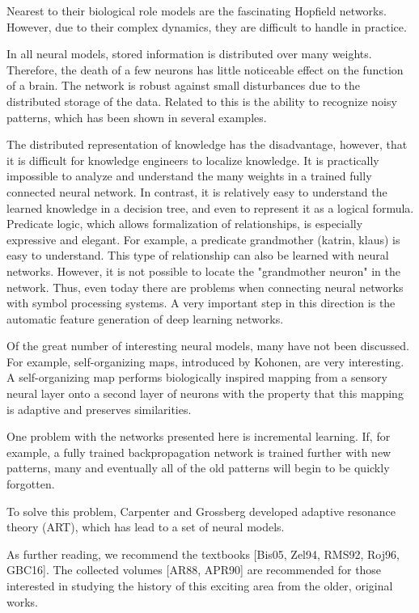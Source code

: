 \documentclass[10pt]{article}
\begin{document}
Nearest to their biological role models are the fascinating Hopfield networks. However, due to their complex dynamics, they are difficult to handle in practice.

In all neural models, stored information is distributed over many weights. Therefore, the death of a few neurons has little noticeable effect on the function of a brain. The network is robust against small disturbances due to the distributed storage of the data. Related to this is the ability to recognize noisy patterns, which has been shown in several examples.

The distributed representation of knowledge has the disadvantage, however, that it is difficult for knowledge engineers to localize knowledge. It is practically impossible to analyze and understand the many weights in a trained fully connected neural network. In contrast, it is relatively easy to understand the learned knowledge in a decision tree, and even to represent it as a logical formula. Predicate logic, which allows formalization of relationships, is especially expressive and elegant. For example, a predicate grandmother (katrin, klaus) is easy to understand. This type of relationship can also be learned with neural networks. However, it is not possible to locate the "grandmother neuron" in the network. Thus, even today there are problems when connecting neural networks with symbol processing systems. A very important step in this direction is the automatic feature generation of deep learning networks.

Of the great number of interesting neural models, many have not been discussed. For example, self-organizing maps, introduced by Kohonen, are very interesting. A self-organizing map performs biologically inspired mapping from a sensory neural layer onto a second layer of neurons with the property that this mapping is adaptive and preserves similarities.

One problem with the networks presented here is incremental learning. If, for example, a fully trained backpropagation network is trained further with new patterns, many and eventually all of the old patterns will begin to be quickly forgotten.

To solve this problem, Carpenter and Grossberg developed adaptive resonance theory (ART), which has lead to a set of neural models.

As further reading, we recommend the textbooks [Bis05, Zel94, RMS92, Roj96, GBC16]. The collected volumes [AR88, APR90] are recommended for those interested in studying the history of this exciting area from the older, original works.
\end{document}

